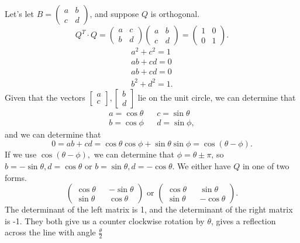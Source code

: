        Let's let $B=\begin{pmatrix} a&b\\c&d \end{pmatrix} $, and suppose $Q$ is orthogonal.
        \[
          Q^{T}\cdot Q=\begin{pmatrix} a&c\\b&d \end{pmatrix} \begin{pmatrix} a&b\\c&d \end{pmatrix} =\begin{pmatrix} 1&0\\0&1 \end{pmatrix} 
        .\] 
        \begin{align*}
          a^2+c^2=1\\
          ab+cd=0\\
          ab+cd=0\\
          b^2+d^2=1
        .\end{align*}
        Given that the vectors $\begin{bmatrix} a\\c \end{bmatrix} ,\begin{bmatrix} b\\d \end{bmatrix} $ lie on the unit circle, we can determine that
        \begin{align*}
          a=\cos\theta&&c=\sin \theta\\
          b=\cos\phi&&d=\sin\phi
        ,\end{align*}
        and we can determine that 
        \[
          0=ab+cd=\cos\theta\cos\phi + \sin \theta\sin\phi=\cos(\theta-\phi)
        .\] 
        If we use $\cos(\theta-\phi),$ we can determine that $\phi = \theta\pm\pi$, so $b=-\sin \theta, d=\cos\theta$ or $b=\sin \theta, d=-\cos\theta$. We either have $Q$ in one of two forms.
        \[
          \begin{pmatrix} \cos\theta&&-\sin \theta\\ \sin \theta&&\cos\theta \end{pmatrix}\text{ or }\begin{pmatrix} \cos\theta && \sin \theta \\ \sin \theta &&-\cos\theta \end{pmatrix}  
        .\] 
        The determinant of the left matrix is 1, and the determinant of the right matrix is -1. They both give us a counter clockwise rotation by $\theta$, gives a reflection across the line with angle $\frac{\theta}{2}$

